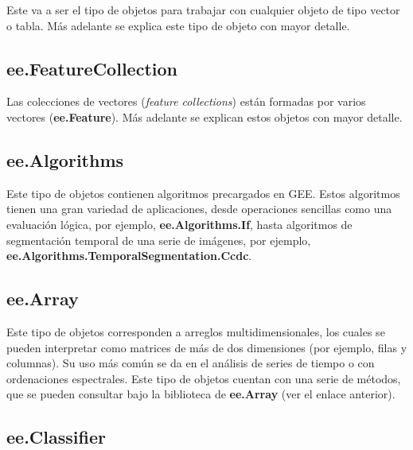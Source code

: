 \documentclass[
  12pt,
  letterpaper,
  twoside]{book}
\newcommand\boldpurple[1]{\textcolor{darkpurple}{\textbf{#1}}}
\begin{document}
Este va a ser el tipo de objetos para trabajar con cualquier objeto de tipo vector o tabla. Más adelante se explica este tipo de objeto con mayor detalle.

\hypertarget{ee.featurecollection}{%
\subsection*{ee.FeatureCollection}\label{ee.featurecollection}}

Las colecciones de vectores (\emph{feature collections}) están formadas por varios vectores (\boldpurple{ee.Feature}). Más adelante se explican estos objetos con mayor detalle.

\hypertarget{ee.algorithms}{%
\subsection*{ee.Algorithms}\label{ee.algorithms}}

Este tipo de objetos contienen algoritmos precargados en GEE. Estos algoritmos tienen una gran variedad de aplicaciones, desde operaciones sencillas como una evaluación lógica, por ejemplo, \boldpurple{ee.Algorithms.If}, hasta algoritmos de segmentación temporal de una serie de imágenes, por ejemplo, \boldpurple{ee.Algorithms.TemporalSegmentation.Ccdc}.

\hypertarget{ee.array}{%
\subsection*{ee.Array}\label{ee.array}}

Este tipo de objetos corresponden a arreglos multidimensionales, los cuales se pueden interpretar como matrices de más de dos dimensiones (por ejemplo, filas y columnas). Su uso más común se da en el análisis de series de tiempo o con ordenaciones espectrales. Este tipo de objetos cuentan con una serie de métodos, que se pueden consultar bajo la biblioteca de \boldpurple{ee.Array} (ver el enlace anterior).

\hypertarget{ee.classifier}{%
\subsection*{ee.Classifier}\label{ee.classifier}}
\end{document}
